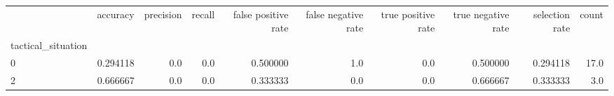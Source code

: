 \begin{tabular}{lrrrrrrrrr}
\toprule
{} &  accuracy &  precision &  recall &  false positive rate &  false negative rate &  true positive rate &  true negative rate &  selection rate &  count \\
tactical\_situation &           &            &         &                      &                      &                     &                     &                 &        \\
\midrule
0                  &  0.294118 &        0.0 &     0.0 &             0.500000 &                  1.0 &                 0.0 &            0.500000 &        0.294118 &   17.0 \\
2                  &  0.666667 &        0.0 &     0.0 &             0.333333 &                  0.0 &                 0.0 &            0.666667 &        0.333333 &    3.0 \\
\bottomrule
\end{tabular}
